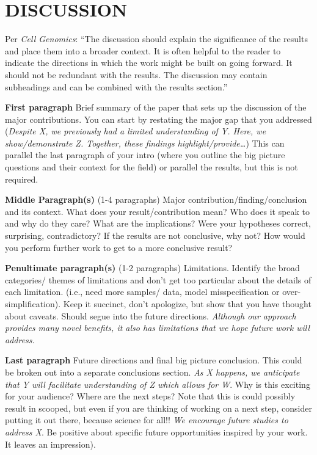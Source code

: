 \section{DISCUSSION}
\discussionTips %
Per \textit{Cell Genomics}: ``The discussion should explain the significance of the results and place them into a broader context. It is often helpful to the reader to indicate the directions in which the work might be built on going forward. It should not be redundant with the results. The discussion may contain subheadings and can be combined with the results section.''

\textbf{First paragraph} Brief summary of the paper that sets up the discussion of the major contributions. You can start by restating the major gap that you addressed (\textit{Despite X, we previously had a limited understanding of Y. Here, we show/demonstrate Z. Together, these findings highlight/provide\dots}) This can parallel the last paragraph of your intro (where you outline the big picture questions and their context for the field) or parallel the results, but this is not required.

\textbf{Middle Paragraph(s)} (1-4 paragraphs) Major contribution/finding/conclusion and its context. What does your result/contribution mean? Who does it speak to and why do they care? What are the implications? Were your hypotheses correct, surprising, contradictory? If the results are not conclusive, why not? How would you perform further work to get to a more conclusive result?

\textbf{Penultimate paragraph(s)} (1-2 paragraphs) Limitations. Identify the broad categories/ themes of limitations and don’t get too particular about the details of each limitation. (i.e., need more samples/ data, model misspecification or over-simplification). Keep it succinct, don’t apologize, but show that you have thought about caveats. Should segue into the future directions. \textit{Although our approach provides many novel benefits, it also has limitations that we hope future work will address.} 

\textbf{Last paragraph} Future directions and final big picture conclusion. This could be broken out into a separate conclusions section. \textit{As X happens, we anticipate that Y will facilitate understanding of Z which allows for W}. Why is this exciting for your audience? Where are the next steps? Note that this is could possibly result in scooped, but even if you are thinking of working on a next step, consider putting it out there, because science for all!! \textit{We encourage future studies to address X}. Be positive about specific future opportunities inspired by your work. It leaves an impression).